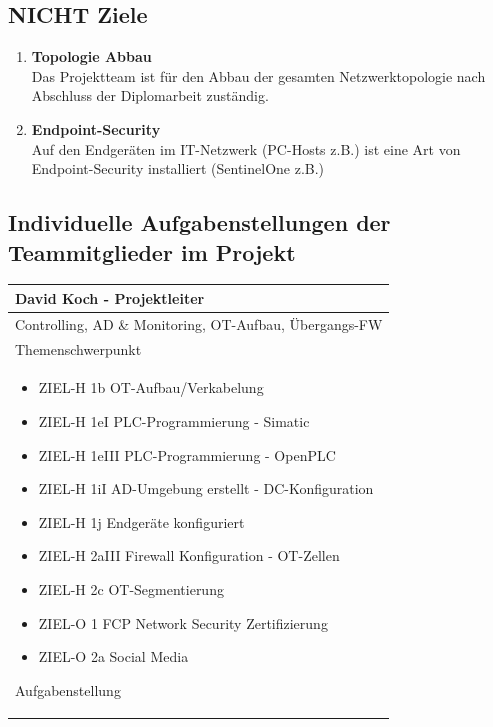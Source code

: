\documentclass[
	headings=optiontotocandhead,%
	oneside,
	numbers=noenddot,%
	toc=flat, %
	10pt, %
	parskip=full, %
	listof=totoc, %
	listof=flat, %
	numbers=noenddot, %
	bibliography=totoc, %
	a4paper,DIV=14,
]{scrartcl}
\begin{document}
\subsection{NICHT Ziele}
\begin{enumerate}[start=1,label={\bfseries Ziel-N \arabic*},leftmargin=*,wide]
\item{\bfseries{Topologie Abbau}}\\
Das Projektteam ist für den Abbau der gesamten Netzwerktopologie nach Abschluss der Diplomarbeit zuständig.
\item{\bfseries{Endpoint-Security}}\\
Auf den Endgeräten im IT-Netzwerk (PC-Hosts z.B.) ist eine Art von Endpoint-Security installiert (SentinelOne z.B.)
\end{enumerate}
\newpage

\subsection{Individuelle Aufgabenstellungen der Teammitglieder im Projekt}
\begin{table}[H]
	\begin{tabularx} {\textwidth} {
			|>{\hsize=1\hsize}X|
		}
		
		\hline
		\rowcolor[HTML]{D9D9D9} 
		\rule{0pt}{15pt}
		\textbf{\normalsize{David Koch - Projektleiter}} \\ \hline
		
		\rule{0pt}{20pt} Controlling, AD \& Monitoring, OT-Aufbau, Übergangs-FW \\
		\rule{0pt}{11pt}\textcolor[HTML]{A6A6A6}{\footnotesize{Themenschwerpunkt}} \\ \hline
		
		\begin{itemize}[itemsep=0pt, parsep=0pt, topsep=0pt]
			\item{ZIEL-H 1b OT-Aufbau/Verkabelung}
			\item{ZIEL-H 1eI PLC-Programmierung - Simatic}
			\item{ZIEL-H 1eIII PLC-Programmierung - OpenPLC}
			\item{ZIEL-H 1iI AD-Umgebung erstellt - DC-Konfiguration}
			\item{ZIEL-H 1j Endgeräte konfiguriert}
			\item{ZIEL-H 2aIII Firewall Konfiguration - OT-Zellen}
			\item{ZIEL-H 2c OT-Segmentierung}
			\item{ZIEL-O 1 FCP Network Security Zertifizierung}
			\item{ZIEL-O 2a Social Media}
		\end{itemize}
		
		\rule{0pt}{11pt}\textcolor[HTML]{A6A6A6}{\footnotesize{Aufgabenstellung}} \\ \hline
	\end{tabularx}
\end{table}
\end{document}
